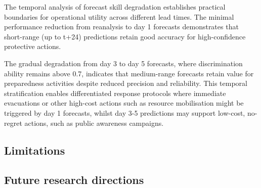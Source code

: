 The temporal analysis of forecast skill degradation establishes practical boundaries for operational utility across different lead times. The minimal performance reduction from reanalysis to day 1 forecasts demonstrates that short-range (up to t+24) predictions retain good accuracy for high-confidence protective actions. 

 The gradual degradation from day 3 to day 5 forecasts, where discrimination ability remains above 0.7, indicates that medium-range forecasts retain value for preparedness activities despite reduced precision and reliability. This temporal stratification enables differentiated response protocols where immediate evacuations or other high-cost actions such as resource mobilisation might be triggered by day 1 forecasts, whilst day 3-5 predictions may support low-cost, no-regret actions, such as public awareness campaigns.
 

\subsection{Limitations}

\subsection{Future research directions}